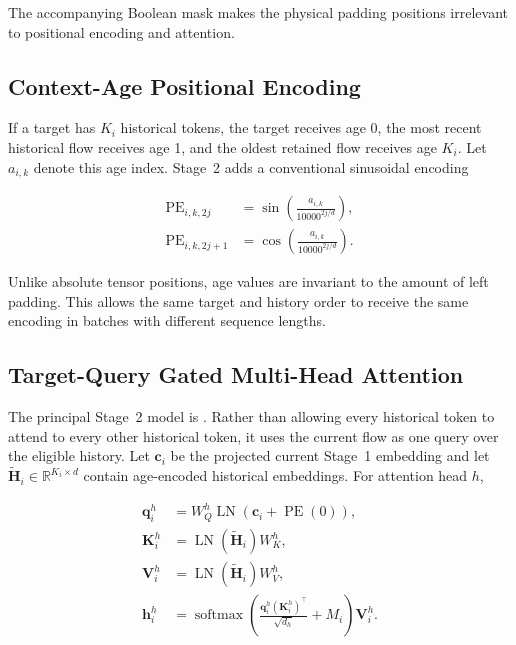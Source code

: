 \documentclass[11pt,fleqn]{report}
\begin{document}
The accompanying Boolean mask makes the physical padding positions irrelevant to positional encoding and attention.

\subsection{Context-Age Positional Encoding}
\label{subsubsec:context_age_encoding}

If a target has $K_i$ historical tokens, the target receives age 0, the most recent historical flow receives age 1, and the oldest retained flow receives age $K_i$. Let $a_{i,k}$ denote this age index. Stage~2 adds a conventional sinusoidal encoding

\begin{align}
    \operatorname{PE}_{i,k,2j}
    &=\sin\left(
        \frac{a_{i,k}}{10000^{2j/d}}
      \right),\\
    \operatorname{PE}_{i,k,2j+1}
    &=\cos\left(
        \frac{a_{i,k}}{10000^{2j/d}}
      \right).
    \label{eq:stage2_age_encoding}
\end{align}

Unlike absolute tensor positions, age values are invariant to the amount of left padding. This allows the same target and history order to receive the same encoding in batches with different sequence lengths.

\subsection{Target-Query Gated Multi-Head Attention}
\label{subsubsec:target_query_attention}

The principal Stage~2 model is . Rather than allowing every historical token to attend to every other historical token, it uses the current flow as one query over the eligible history. Let $\mathbf{c}_i$ be the projected current Stage~1 embedding and let $\widetilde{\mathbf{H}}_i\in\mathbb{R}^{K_i\times d}$ contain age-encoded historical embeddings. For attention head $h$,

\begin{align}
    \mathbf{q}^{h}_i
    &=W_Q^{h}\operatorname{LN}
      \left(\mathbf{c}_i+\operatorname{PE}(0)\right),\\
    \mathbf{K}^{h}_i
    &=\operatorname{LN}(\widetilde{\mathbf{H}}_i)W_K^{h},\\
    \mathbf{V}^{h}_i
    &=\operatorname{LN}(\widetilde{\mathbf{H}}_i)W_V^{h},\\
    \mathbf{h}^{h}_i
    &=\operatorname{softmax}
      \left(
        \frac{\mathbf{q}^{h}_i(\mathbf{K}^{h}_i)^{\top}}
             {\sqrt{d_h}}+M_i
      \right)
      \mathbf{V}^{h}_i.
    \label{eq:target_query_attention}
\end{align}
\end{document}
